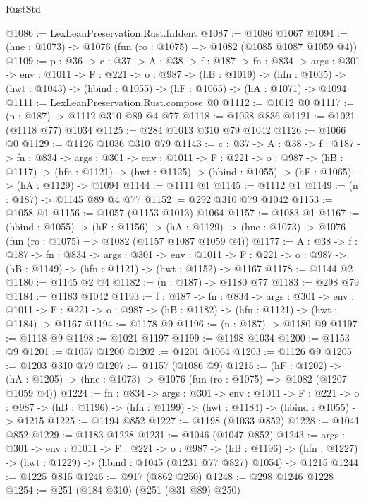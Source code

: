 \begin{lexlean}{RustStd}
\begin{coremodule}
@1086 := LexLeanPreservation.Rust.fnIdent
@1087 := @1086 @1067
@1094 := (hne : @1073) -> @1076 (fun (ro : @1075) => @1082 (@1085 @1087 @1059 @4))
@1109 := {p : @36} ->
  {c : @37} ->
  {A : @38} ->
  {f : @187} ->
  {fn : @834} ->
  {args : @301} ->
  {env : @1011} ->
  {F : @221} ->
  {o : @987} ->
  (hB : @1019) ->
  (hfn : @1035) -> (hwt : @1043) -> (hbind : @1055) -> (hF : @1065) -> (hA : @1071) -> @1094
@1111 := LexLeanPreservation.Rust.compose @0
@1112 := @1012 @0
@1117 := (n : @187) -> @1112 @310 @89 @4 @77
@1118 := @1028 @836
@1121 := @1021 (@1118 @77) @1034
@1125 := @284 @1013 @310 @79 @1042
@1126 := @1066 @0
@1129 := @1126 @1036 @310 @79
@1143 := {c : @37} ->
  {A : @38} ->
  {f : @187} ->
  {fn : @834} ->
  {args : @301} ->
  {env : @1011} ->
  {F : @221} ->
  {o : @987} ->
  (hB : @1117) ->
  (hfn : @1121) -> (hwt : @1125) -> (hbind : @1055) -> (hF : @1065) -> (hA : @1129) -> @1094
@1144 := @1111 @1
@1145 := @1112 @1
@1149 := (n : @187) -> @1145 @89 @4 @77
@1152 := @292 @310 @79 @1042
@1153 := @1058 @1
@1156 := @1057 (@1153 @1013) @1064
@1157 := @1083 @1
@1167 := (hbind : @1055) ->
  (hF : @1156) ->
  (hA : @1129) -> (hne : @1073) -> @1076 (fun (ro : @1075) => @1082 (@1157 @1087 @1059 @4))
@1177 := {A : @38} ->
  {f : @187} ->
  {fn : @834} ->
  {args : @301} ->
  {env : @1011} ->
  {F : @221} -> {o : @987} -> (hB : @1149) -> (hfn : @1121) -> (hwt : @1152) -> @1167
@1178 := @1144 @2
@1180 := @1145 @2 @4
@1182 := (n : @187) -> @1180 @77
@1183 := @298 @79
@1184 := @1183 @1042
@1193 := {f : @187} ->
  {fn : @834} ->
  {args : @301} ->
  {env : @1011} ->
  {F : @221} -> {o : @987} -> (hB : @1182) -> (hfn : @1121) -> (hwt : @1184) -> @1167
@1194 := @1178 @9
@1196 := (n : @187) -> @1180 @9
@1197 := @1118 @9
@1198 := @1021 @1197
@1199 := @1198 @1034
@1200 := @1153 @9
@1201 := @1057 @1200
@1202 := @1201 @1064
@1203 := @1126 @9
@1205 := @1203 @310 @79
@1207 := @1157 (@1086 @9)
@1215 := (hF : @1202) ->
  (hA : @1205) -> (hne : @1073) -> @1076 (fun (ro : @1075) => @1082 (@1207 @1059 @4))
@1224 := {fn : @834} ->
  {args : @301} ->
  {env : @1011} ->
  {F : @221} ->
  {o : @987} -> (hB : @1196) -> (hfn : @1199) -> (hwt : @1184) -> (hbind : @1055) -> @1215
@1225 := @1194 @852
@1227 := @1198 (@1033 @852)
@1228 := @1041 @852
@1229 := @1183 @1228
@1231 := @1046 (@1047 @852)
@1243 := {args : @301} ->
  {env : @1011} ->
  {F : @221} ->
  {o : @987} ->
  (hB : @1196) -> (hfn : @1227) -> (hwt : @1229) -> (hbind : @1045 (@1231 @77 @827) @1054) -> @1215
@1244 := @1225 @815
@1246 := @917 (@862 @250)
@1248 := @298 @1246 @1228
@1254 := @251 (@184 @310) (@251 (@31 @89) @250)

\end{coremodule}
\end{lexlean}
